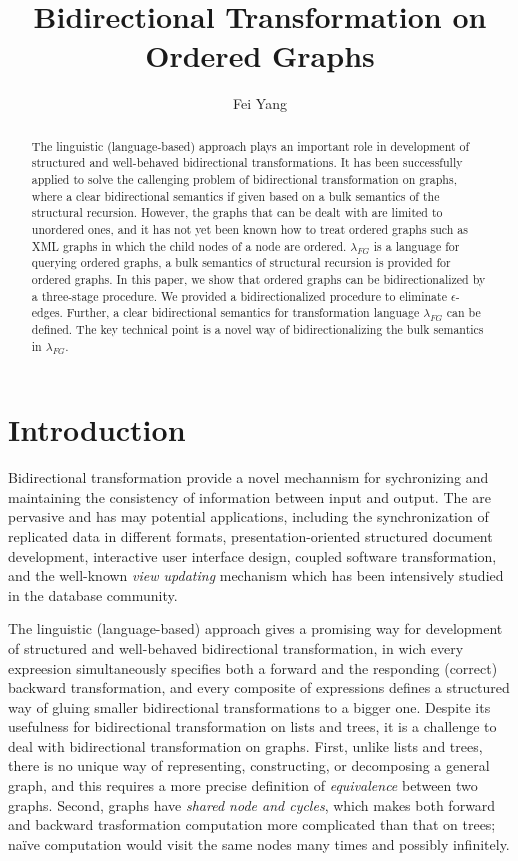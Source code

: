 \documentclass{llncs}
\title{Bidirectional Transformation on Ordered Graphs}
\author{Fei Yang}
\institute
{ BASICS\\
  Department of Computer Science and Engineering\\
  Shanghai Jiao Tong University, P.R.China\\
  \email{iamyf@sjtu.edu.cn}
}
\begin{document}
\maketitle


\begin{abstract}
The linguistic (language-based) approach plays an important role in development of structured and well-behaved bidirectional transformations. It has been successfully applied to solve the callenging problem of bidirectional transformation on graphs, where a clear bidirectional semantics if given based on a bulk semantics of the structural recursion. However, the graphs that can be dealt with are limited to unordered ones, and it has not yet been known how to treat ordered graphs such as XML graphs in which the child nodes of a node are ordered. $\lambda_{FG}$ is a language for querying ordered graphs, a bulk semantics of structural recursion is provided for ordered graphs. In this paper, we show that ordered graphs can be bidirectionalized by a three-stage procedure. We provided a bidirectionalized procedure to eliminate $\epsilon$-edges. Further, a clear bidirectional semantics for transformation language $\lambda_{FG}$ can be defined. The key technical point is a novel way of bidirectionalizing the bulk semantics in $\lambda_{FG}$.
\end{abstract}


\section{Introduction}\label{sec:intro}

Bidirectional transformation provide a novel mechannism for sychronizing and maintaining the consistency of information between input and output. The are pervasive and has may potential applications, including the synchronization of replicated data in different formats, presentation-oriented structured document development, interactive user interface design, coupled software transformation, and the well-known \emph{view updating} mechanism which has been intensively studied in the database community.

The linguistic (language-based) approach gives a promising way for development of structured and well-behaved bidirectional transformation, in wich every expreesion simultaneously specifies both a forward and the responding (correct) backward transformation, and every composite of expressions defines a structured way of gluing smaller bidirectional transformations to a bigger one. Despite its usefulness for bidirectional transformation on lists and trees, it is a challenge to deal with bidirectional transformation on graphs. First, unlike lists and trees, there is no unique way of representing, constructing, or decomposing a general graph, and this requires a more precise definition of \emph{equivalence} between two graphs. Second, graphs have \emph{shared node and cycles}, which makes both forward and backward trasformation computation more complicated than that on trees; na\"{i}ve computation would visit the same nodes many times and possibly infinitely.
\end{document}
